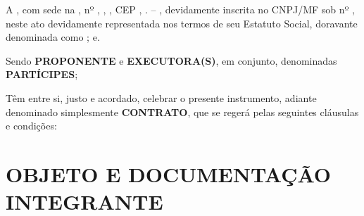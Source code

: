 A \textbf{\NomeExecutoraB}, com sede na \EnderecoExecutoraB, nº \numeroEnderecoExecutoraB, \ComplementoEnderecoExecutoraB, \BairroExecutoraB, CEP \CEPExecutoraB, \CidadeEnderecoExecutoraB. – \EstadoEnderecoExecutoraB, devidamente inscrita no CNPJ/MF sob nº \NumCNPJExecutoraB, neste ato devidamente representada nos termos de seu Estatuto Social, doravante denominada como  \textbf{\NomeExecutoraBResumido}; e.

Sendo \textbf{PROPONENTE} e \textbf{EXECUTORA(S)}, em conjunto, denominadas \textbf{PARTÍCIPES};

Têm entre si, justo e acordado, celebrar o presente instrumento, adiante denominado simplesmente \textbf{CONTRATO}, que se regerá pelas seguintes cláusulas e condições:

\chapter{OBJETO E DOCUMENTAÇÃO INTEGRANTE}
